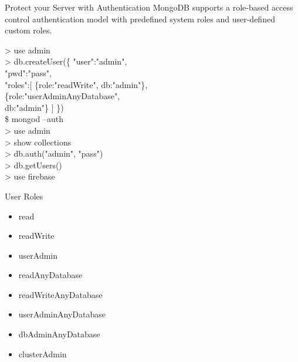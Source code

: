 \documentclass{beamer}
\begin{document}
\begin{frame}{Protect your Server with  Authentication}
    MongoDB supports a role-based access control authentication model with predefined system roles and user-defined custom roles.
    
    \begin{minipage}[t]{0.64\textwidth}
    	\scriptsize
    	\begin{Alms*}
    		> use admin \\
    		> db.createUser(\{\NI
    		"user":"admin", \\
    		"pwd":"pass", \\
    		"roles":[ \NI
    		\{role:"readWrite", db:"admin"\}, \\
    		\{role:"userAdminAnyDatabase", \\db:"admin"\}
    		\ND]
    		\ND \}) \\
    		\$ mongod --auth \\
    		> use admin \\
    		> show collections \\
    		> db.auth("admin", "pass") \\
    		> db.getUsers() \\
    		> use firebase
    		
    	\end{Alms*}
    \end{minipage}
	\hfill
	\begin{minipage}[t]{0.35\textwidth}
		\scriptsize
		\begin{block}{User Roles}
			\begin{itemize}
				\item read
				\item readWrite
				\item userAdmin
				\item readAnyDatabase
				\item readWriteAnyDatabase
				\item userAdminAnyDatabase
				\item dbAdminAnyDatabase
				\item clusterAdmin
			\end{itemize}
		\end{block}
	\end{minipage}
\end{frame}
\end{document}
